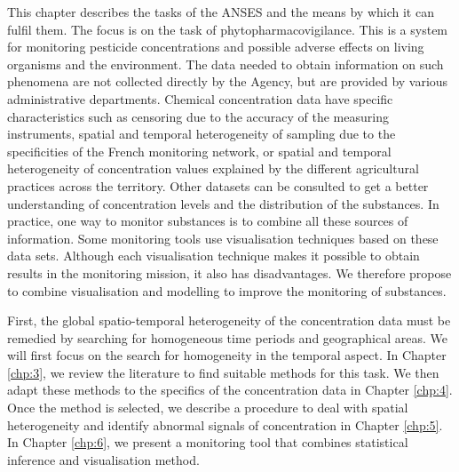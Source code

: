 This chapter describes the tasks of the ANSES and the means by which it can fulfil them. The focus is on the task of phytopharmacovigilance. This is a system for monitoring pesticide concentrations and possible adverse effects on living organisms and the environment. The data needed to obtain information on such phenomena are not collected directly by the Agency, but are provided by various administrative departments. Chemical concentration data have specific characteristics such as censoring due to the accuracy of the measuring instruments, spatial and temporal heterogeneity of sampling due to the specificities of the French monitoring network, or spatial and temporal heterogeneity of concentration values explained by the different agricultural practices across the territory. Other datasets can be consulted to get a better understanding of concentration levels and the distribution of the substances. In practice, one way to monitor substances is to combine all these sources of information. Some monitoring tools use visualisation techniques based on these data sets. Although each visualisation technique makes it possible to obtain results in the monitoring mission, it also has disadvantages. We therefore propose to combine visualisation and modelling to improve the monitoring of substances. 

First, the global spatio-temporal heterogeneity of the concentration data must be remedied by searching for homogeneous time periods and geographical areas. We will first focus on the search for homogeneity in the temporal aspect. In Chapter \ref{chp:3}, we review the literature to find suitable methods for this task. We then adapt these methods to the specifics of the concentration data in Chapter \ref{chp:4}. Once the method is selected, we describe a procedure to deal with spatial heterogeneity and identify abnormal signals of concentration in Chapter \ref{chp:5}. In Chapter \ref{chp:6}, we present a monitoring tool that combines statistical inference and visualisation method.  




 
 


